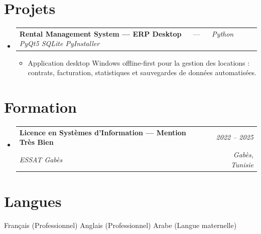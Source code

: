 \documentclass[letterpaper,9pt]{article}
\makeatletter
\newcommand{\resumeItem}[1]{\item\small{#1}}
\newcommand{\resumeSubheading}[4]{
  \vspace{-1pt}\item
  \begin{tabular*}{0.97\textwidth}[t]{l@{\extracolsep{\fill}}r}
    \textbf{#1} & \textit{\color{greytext}#2} \\
    \textit{\small\color{greytext} #3} & \textit{\small\color{greytext} #4}
  \end{tabular*}\vspace{-2pt}
}
\newcommand{\resumeProjectHeading}[2]{
  \item
  \begin{tabular*}{0.97\textwidth}{l@{\extracolsep{\fill}}r}
    \small #1 & #2
  \end{tabular*}\vspace{-1pt}
}
\newcommand{\resumeSubHeadingListStart}{\begin{itemize}[leftmargin=0.18in, label={}, itemsep=1.2pt, topsep=2.5pt, parsep=0pt]}
\newcommand{\resumeSubHeadingListEnd}{\end{itemize}\vspace{-2pt}}
\newcommand{\resumeProjectListStart}{\begin{itemize}[leftmargin=0.24in, label={}, itemsep=0.9pt, topsep=1.2pt, parsep=0pt]}
\newcommand{\resumeProjectListEnd}{\end{itemize}\vspace{-2pt}}
\makeatother
\begin{document}
\section{Projets}
\resumeSubHeadingListStart

  \resumeProjectHeading{\textbf{Rental Management System --- ERP Desktop} $\quad$ --- $\quad$ \emph{\color{greytext}Python \textperiodcentered{} PyQt5 \textperiodcentered{} SQLite \textperiodcentered{} PyInstaller}}{}
    \resumeProjectListStart
      \resumeItem{Application desktop Windows of\hspace{0pt}fline-first pour la gestion des locations : contrats, facturation, statistiques et sauvegardes de données automatisées.}
    \resumeProjectListEnd

\resumeSubHeadingListEnd\vspace{-3pt}

\section{Formation}
\resumeSubHeadingListStart
  \resumeSubheading{Licence en Systèmes d'Information --- Mention Très Bien}{2022 -- 2025}{ESSAT Gabès}{Gabès, Tunisie}
\resumeSubHeadingListEnd\vspace{-1pt}

\section{Langues}
\begin{itemize}[leftmargin=0.18in, label={}, topsep=2pt, itemsep=1pt, parsep=0pt]
\footnotesize{
  \item Français (Professionnel) \textperiodcentered{} Anglais (Professionnel) \textperiodcentered{} Arabe (Langue maternelle)
}
\end{itemize}
\end{document}
